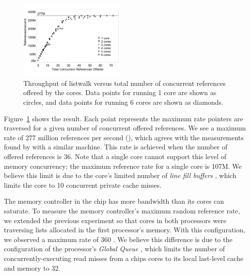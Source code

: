 \documentclass[10pt,nocopyrightspace,preprint]{sigplanconf}
\begin{document}
\begin{figure}[h]
	\begin{center}
		\includegraphics[width=0.47\textwidth]{figures/multi-listwalk-totalconc-edited.pdf}
	\end{center}
	\caption{Throughput of listwalk versus total number of
          concurrent references offered by the cores. Data points for
          running 1 core are shown as circles, and data points for
          running 6 cores are shown as diamonds. 
        }
	\label{fig:listwalk-totalconc}
\end{figure}

Figure~\ref{fig:listwalk-totalconc} shows the result. Each point represents
the maximum rate pointers are traversed for a given number of
concurrent offered references. We see a maximum rate of 277 million references per second (\mrps), which agrees with the measurements found by \cite{Mandal:2010} with a similar machine. This rate is achieved when the number of offered references is 36. Note that a single core cannot support this level of
memory concurrency; the maximum reference rate for a single core is
107M. We believe this limit is due to the core's limited number of {\em line fill
  buffers} \cite{nehalem:arch}, which limits the core to 10
concurrent private cache misses.

The memory controller in the chip has more bandwidth than its
cores can saturate. To measure the memory controller's maximum random
reference rate, we extended the previous experiment so that cores in
both processors were traversing lists allocated in the first processor's
memory. With this configuration, we observed a maximum rate of 360
\mrps. We believe this difference is due to
the configuration of the processor's {\em Global Queue} \cite{nehalem:perf}, which limits the number of concurrently-executing read misses from a chips cores to its local last-level cache and memory to 32.
\end{document}
